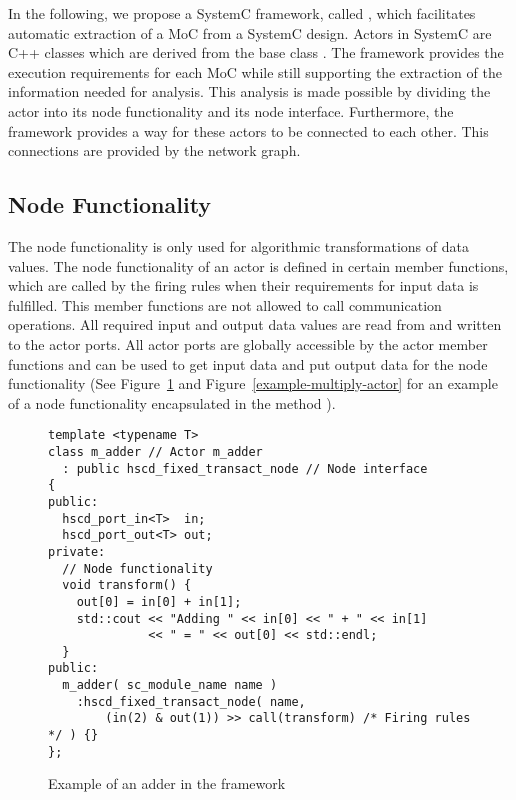 In the following, we propose a SystemC framework, called \SysteMoC, which
facilitates automatic extraction of a MoC from a SystemC design.
Actors in SystemC are C++ classes which are derived from the base class .
The \SysteMoC{} framework provides the execution requirements for each MoC while
still supporting the extraction of the information needed for analysis.
This analysis is made possible by dividing the actor into its
node functionality and its node interface.
Furthermore, the \SysteMoC{} framework provides a way for these
actors to be connected to each other. This connections
are provided by the network graph.

\subsection{Node Functionality}
The node functionality is only used for algorithmic transformations of data values.
The node functionality of an actor is defined in certain member functions,
which are called by the firing rules when their requirements for input data is fulfilled.
This member functions are not allowed to call communication operations. All required
input and output data values are read from
and written to the actor ports. All actor ports are globally accessible
by the actor member functions and can be used to get input data
and put output data for the node functionality
(See Figure~\ref{example-adder-actor} and Figure~\ref{example-multiply-actor}
 for an example of a node functionality encapsulated in the method ).

\begin{figure}[h]
\centering
\begin{verbatim}
template <typename T>
class m_adder // Actor m_adder
  : public hscd_fixed_transact_node // Node interface
{
public:
  hscd_port_in<T>  in;
  hscd_port_out<T> out;
private:
  // Node functionality
  void transform() {
    out[0] = in[0] + in[1];
    std::cout << "Adding " << in[0] << " + " << in[1]
              << " = " << out[0] << std::endl;
  }
public:
  m_adder( sc_module_name name )
    :hscd_fixed_transact_node( name,
        (in(2) & out(1)) >> call(transform) /* Firing rules */ ) {}
};
\end{verbatim}
\caption{\label{example-adder-actor}Example of an adder in the \SysteMoC{} framework}
\end{figure}

